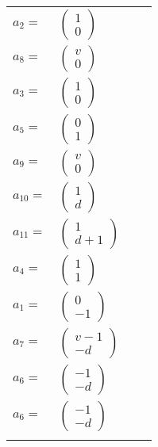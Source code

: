 \documentclass[1p]{elsarticle_modified}
\theoremstyle{definition}
\begin{document}
\begin{tabular}{m{7pt} m{180pt} m{7pt} m{180pt} }
\flushright $a_{2}=$&$\begin{pmatrix}1\\0\end{pmatrix}$ \\
\flushright $a_{8}=$&$\begin{pmatrix}v\\0\end{pmatrix}$ \\
\flushright $a_{3}=$&$\begin{pmatrix}1\\0\end{pmatrix}$ \\
\flushright $a_{5}=$&$\begin{pmatrix}0\\1\end{pmatrix}$ \\
\flushright $a_{9}=$&$\begin{pmatrix}v\\0\end{pmatrix}$ \\
\flushright $a_{10}=$&$\begin{pmatrix}1\\d\end{pmatrix}$ \\
\flushright $a_{11}=$&$\begin{pmatrix}1\\d+1\end{pmatrix}$ \\
\flushright $a_{4}=$&$\begin{pmatrix}1\\1\end{pmatrix}$ \\
\flushright $a_{1}=$&$\begin{pmatrix}0\\-1\end{pmatrix}$ \\
\flushright $a_{7}=$&$\begin{pmatrix}v-1\\- d\end{pmatrix}$ \\
\flushright $a_{6}=$&$\begin{pmatrix}-1\\- d\end{pmatrix}$\\ \flushright $a_{6}=$&$\begin{pmatrix}-1\\- d\end{pmatrix}$\\&\end{tabular}
\end{document}
